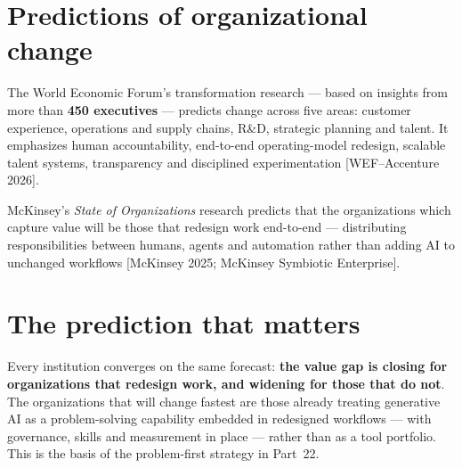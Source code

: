 \section{Predictions of organizational change}

The World Economic Forum's transformation research — based on insights from
more than \textbf{450 executives} — predicts change across five areas:
customer experience, operations and supply chains, R\&D, strategic planning
and talent. It emphasizes human accountability, end-to-end operating-model
redesign, scalable talent systems, transparency and disciplined
experimentation [WEF--Accenture 2026].

McKinsey's \textit{State of Organizations} research predicts that the
organizations which capture value will be those that redesign work
end-to-end — distributing responsibilities between humans, agents and
automation rather than adding AI to unchanged workflows [McKinsey 2025;
McKinsey Symbiotic Enterprise].

\begin{center}
\end{center}

\section{The prediction that matters}

Every institution converges on the same forecast: \textbf{the value gap is
closing for organizations that redesign work, and widening for those that do
not}. The organizations that will change fastest are those already treating
generative AI as a problem-solving capability embedded in redesigned
workflows — with governance, skills and measurement in place — rather than as
a tool portfolio. This is the basis of the problem-first strategy in
Part~22.

